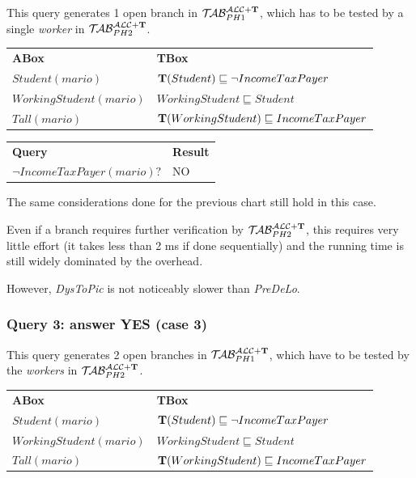\documentclass[a4paper, 11pt, oneside]{duthesis}
\newcommand{\tip}{{\bf T}}
\newcommand{\primo}{\mathrel{{\mathcal{T}\!\mathcal{AB}}}_{PH 1}^{\mathcal{ALC}+\mbox{\scriptsize $\tip$}}}
\newcommand{\secondo}{\mathrel{{\mathcal{T}\!\mathcal{AB}}}_{PH 2}^{\mathcal{ALC}+\mbox{\scriptsize $\tip$}}}
\begin{document}
This query generates 1 open branch in $\primo$, which has to be tested by a single \emph{worker} in $\secondo$.\\

\begin{tabular}{ll}
	\textbf{ABox} & \textbf{TBox}\\
	$Student(mario)$ & $\tip(Student) \sqsubseteq \neg IncomeTaxPayer$\\
	$WorkingStudent(mario)$ & $WorkingStudent \sqsubseteq Student$\\
	$Tall(mario)$ & $\tip(WorkingStudent) \sqsubseteq IncomeTaxPayer$\\[0.5cm]
\end{tabular}

\begin{tabular}{ll}
\textbf{Query} & \textbf{Result}\\
$\neg IncomeTaxPayer(mario)?$ & NO\\
\end{tabular}


\begin{figure}[ht]
\begin{bchart}[step=200,max=200,unit=ms,scale=1.4]
    \medskip
    \medskip
    \medskip
    \medskip
\end{bchart}
\caption{}
\end{figure}

The same considerations done for the previous chart still hold in this case.

Even if a branch requires further verification by $\secondo$, this requires very little effort (it takes less than 2 ms if done sequentially) and the running time is still widely dominated by the overhead.

However, \emph{DysToPic} is not noticeably slower than \emph{PreDeLo}.

\newpage

\subsubsection{Query 3: answer YES (case 3)}

This query generates 2 open branches in $\primo$, which have to be tested by the \emph{workers} in $\secondo$.\\

\begin{tabular}{ll}
	\textbf{ABox} & \textbf{TBox}\\
	$Student(mario)$ & $\tip(Student) \sqsubseteq \neg IncomeTaxPayer$\\
	$WorkingStudent(mario)$ & $WorkingStudent \sqsubseteq Student$\\
	$Tall(mario)$ & $\tip(WorkingStudent) \sqsubseteq IncomeTaxPayer$\\[0.5cm]
\end{tabular}
\end{document}
